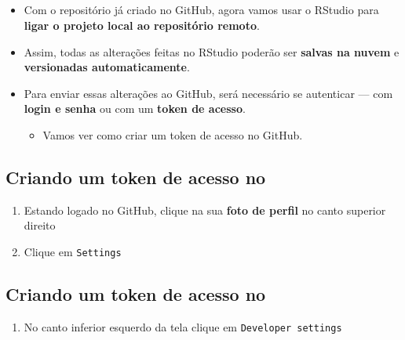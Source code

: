\documentclass[
  letterpaper,
  DIV=11,
  numbers=noendperiod]{scrartcl}
\providecommand{\tightlist}{%
  \setlength{\itemsep}{0pt}\setlength{\parskip}{0pt}}
\begin{document}
\subsection{}\label{section}

\begin{itemize}
\item
  Com o repositório já criado no GitHub, agora vamos usar o RStudio para
  \textbf{ligar o projeto local ao repositório remoto}.
\item
  Assim, todas as alterações feitas no RStudio poderão ser
  \textbf{salvas na nuvem} e \textbf{versionadas automaticamente}.
\item
  Para enviar essas alterações ao GitHub, será necessário se autenticar
  --- com \textbf{login e senha} ou com um \textbf{token de acesso}.

  \begin{itemize}
  \tightlist
  \item
    Vamos ver como criar um token de acesso no GitHub.
  \end{itemize}
\end{itemize}

\subsection{\texorpdfstring{Criando um token de acesso no
}{Criando um token de acesso no }}\label{criando-um-token-de-acesso-no}

\begin{enumerate}
\def\labelenumi{\arabic{enumi}.}
\tightlist
\item
  Estando logado no GitHub, clique na sua \textbf{foto de perfil} no
  canto superior direito\\
\item
  Clique em \texttt{Settings}
\end{enumerate}

\subsection{\texorpdfstring{Criando um token de acesso no
}{Criando um token de acesso no }}\label{criando-um-token-de-acesso-no-1}

\begin{enumerate}
\def\labelenumi{\arabic{enumi}.}
\setcounter{enumi}{2}
\tightlist
\item
  No canto inferior esquerdo da tela clique em
  \texttt{Developer\ settings}
\end{enumerate}
\end{document}
